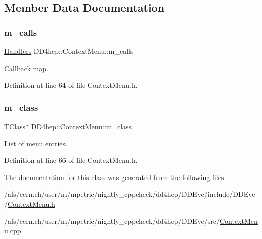 \subsection{Member Data Documentation}
\hypertarget{class_d_d4hep_1_1_context_menu_a4434fe38593c7eb73a8543cf1f8258ed}{}\label{class_d_d4hep_1_1_context_menu_a4434fe38593c7eb73a8543cf1f8258ed} 
\subsubsection{\texorpdfstring{m\+\_\+calls}{m\_calls}}
{\footnotesize\ttfamily \hyperlink{class_d_d4hep_1_1_context_menu_adafcfb2730659701df2a5364333ed386}{Handlers} D\+D4hep\+::\+Context\+Menu\+::m\+\_\+calls\hspace{0.3cm}{\ttfamily [private]}}



\hyperlink{class_d_d4hep_1_1_callback}{Callback} map. 



Definition at line 64 of file Context\+Menu.\+h.

\hypertarget{class_d_d4hep_1_1_context_menu_ad9be22966c34ce07b6e83b2195bddad1}{}\label{class_d_d4hep_1_1_context_menu_ad9be22966c34ce07b6e83b2195bddad1} 
\subsubsection{\texorpdfstring{m\+\_\+class}{m\_class}}
{\footnotesize\ttfamily T\+Class$\ast$ D\+D4hep\+::\+Context\+Menu\+::m\+\_\+class\hspace{0.3cm}{\ttfamily [private]}}



List of menu entries. 



Definition at line 66 of file Context\+Menu.\+h.



The documentation for this class was generated from the following files\+:\begin{DoxyCompactItemize}
\item 
/afs/cern.\+ch/user/m/mpetric/nightly\+\_\+cppcheck/dd4hep/\+D\+D\+Eve/include/\+D\+D\+Eve/\hyperlink{_context_menu_8h}{Context\+Menu.\+h}\item 
/afs/cern.\+ch/user/m/mpetric/nightly\+\_\+cppcheck/dd4hep/\+D\+D\+Eve/src/\hyperlink{_context_menu_8cpp}{Context\+Menu.\+cpp}\end{DoxyCompactItemize}
